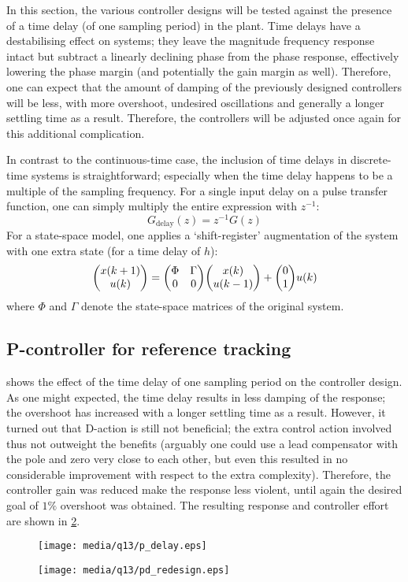 In this section, the various controller designs will be tested against the presence of a time delay (of one sampling period) in the plant. Time delays have a destabilising effect on systems; they leave the magnitude frequency response intact but subtract a linearly declining phase from the phase response, effectively lowering the phase margin (and potentially the gain margin as well). Therefore, one can expect that the amount of damping of the previously designed controllers will be less, with more overshoot, undesired oscillations and generally a longer settling time as a result. Therefore, the controllers will be adjusted once again for this additional complication. \cite{nise}

In contrast to the continuous-time case, the inclusion of time delays in discrete-time systems is straightforward; especially when the time delay happens to be a multiple of the sampling frequency. For a single input delay on a pulse transfer function, one can simply multiply the entire expression with $z^{-1}$:
                         $$ G_\text{delay}(z) = z^{-1}G(z) $$
For a state-space model, one applies a `shift-register' augmentation of the system with one extra state (for a time delay of $h$):
                    $$ \mqty(x(k+1)\\u(k)) = \mqty(\Phi & \Gamma\\0&0)\mqty(x(k)\\u(k-1)) + \mqty(0\\1)u(k)$$ 
where $\Phi$ and $\Gamma$ denote the state-space matrices of the original system.

\subsection{P-controller for reference tracking}
 shows the effect of the time delay of one sampling period on the controller design. As one might expected, the time delay results in less damping of the response; the overshoot has increased with a longer settling time as a result. However, it turned out that D-action is still not beneficial; the extra control action involved thus not outweight the benefits (arguably one could use a lead compensator with the pole and zero very close to each other, but even this resulted in no considerable improvement with respect to the extra complexity). Therefore, the controller gain was reduced make the response less violent, until again the desired goal of $1\%$ overshoot was obtained. The resulting response and controller effort are shown in \cref{fig:q13_pd_redesign}.
\begin{figure}[ht]
    \centering
    \texttt{[image: media/q13/p\_delay.eps]}
    \caption{}
    \label{fig:q13_p_delay}
\end{figure}
\begin{figure}[ht]
    \centering
    \texttt{[image: media/q13/pd\_redesign.eps]}
    \caption{}
    \label{fig:q13_pd_redesign}
\end{figure}
\FloatBarrier

